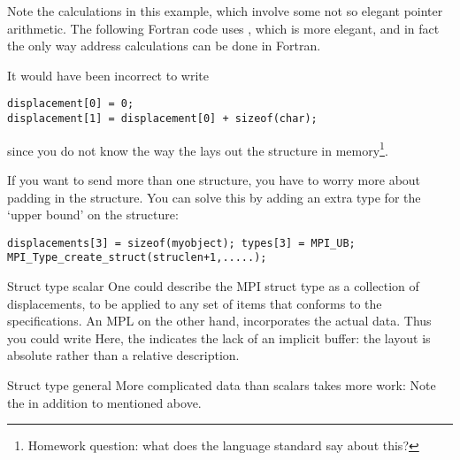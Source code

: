 
Note the  calculations in this example,
which involve some not so elegant pointer arithmetic.
The following Fortran code uses ,
which is more elegant, and in fact
the only way address calculations can be done in Fortran.


It would have been incorrect to write
\begin{lstlisting}
displacement[0] = 0;
displacement[1] = displacement[0] + sizeof(char);
\end{lstlisting}
since you do not know the way the  lays out the
structure in memory\footnote{Homework question: what does the language
  standard say about this?}.

If you want to send more than one structure, you have to worry more
about padding in the structure. You can solve this by adding an extra
type  for the `upper bound' on the structure:
\begin{lstlisting}
displacements[3] = sizeof(myobject); types[3] = MPI_UB;
MPI_Type_create_struct(struclen+1,.....);
\end{lstlisting}

\begin{mplnote}{Struct type scalar}
  One could describe the MPI struct type as a collection of
  displacements, to be applied to any set of items that conforms
  to the specifications.
  An \ac{MPL}  on the other hand,
  incorporates the actual data. Thus you could write
  Here, the  indicates the lack of an implicit buffer:
  the layout is absolute rather than a relative description.
\end{mplnote}

\begin{mplnote}{Struct type general}
  More complicated data than scalars takes more work:
  Note the  in addition to
   mentioned above.
\end{mplnote}
